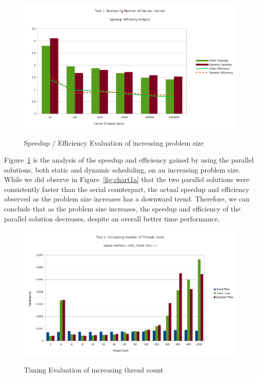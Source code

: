 \documentclass{article}
\begin{document}
\begin{figure}[H]
  \caption{Speedup / Efficiency Evaluation of increasing problem size}
  \centering
  \includegraphics[width=\textwidth]{chart1b}
  \label{fig:chart1b}
\end{figure}

Figure~\ref{fig:chart1b} is the analysis of the speedup and efficiency gained by using the parallel solutions, 
both static and dynamic scheduling, on an increasing problem size. While we did observe in Figure~\ref{fig:chart1a} 
that the two parallel solutions were consistently faster than the serial counterpart, the actual speedup and 
efficiency observed as the problem size increases has a downward trend. Therefore, we can conclude that as the 
problem size increases, the speedup and efficiency of the parallel solution decreases, despite an overall better 
time performance.

\begin{figure}[H]
  \caption{Timing Evaluation of increasing thread count}
  \centering
  \includegraphics[width=\textwidth]{chart2a}
    \label{fig:chart2a}
\end{figure}
\end{document}
